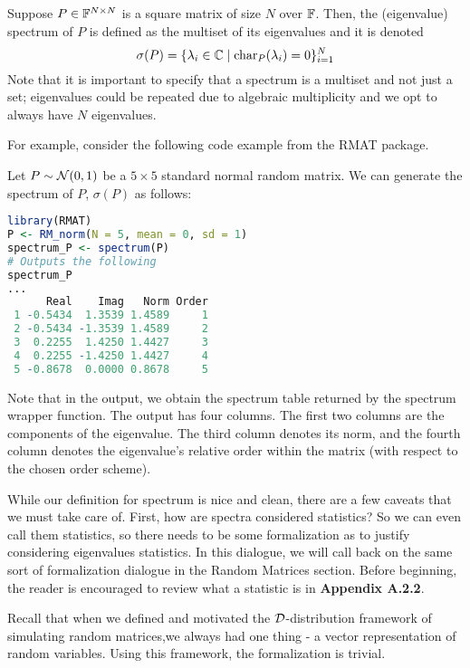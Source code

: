 
\begin{definition}[Spectrum]
Suppose $P \in \mathbb{F}^{N \times N}$ is a square matrix of size $N$ over $\mathbb{F}$. Then, the (eigenvalue) spectrum of $P$ is defined as the multiset of its eigenvalues and it is denoted
$$\sigma(P) = \{\lambda_i \in \mathbb{C} \mid \text{char}_P(\lambda_i) = 0 \}_{i=1}^N$$
Note that it is important to specify that a spectrum is a multiset and not just a set; eigenvalues could be repeated due to algebraic multiplicity and we opt to always have $N$ eigenvalues.
\end{definition}

\medskip
\noindent For example, consider the following code example from the RMAT package.
\begin{code}
Let $P \sim \mathcal{N}(0,1)$ be a $5 \times 5$ standard normal random matrix. We can generate the spectrum of $P$, $\sigma(P)$ as follows:
\end{code}

\begin{lstlisting}[language=R]
library(RMAT)
P <- RM_norm(N = 5, mean = 0, sd = 1)
spectrum_P <- spectrum(P)
# Outputs the following
spectrum_P
...
      Real    Imag   Norm Order
 1 -0.5434  1.3539 1.4589     1
 2 -0.5434 -1.3539 1.4589     2
 3  0.2255  1.4250 1.4427     3
 4  0.2255 -1.4250 1.4427     4
 5 -0.8678  0.0000 0.8678     5
\end{lstlisting}

Note that in the output, we obtain the spectrum table returned by the spectrum wrapper function. The output has four columns.
The first two columns are the components of the eigenvalue. The third column denotes its norm, and the fourth column denotes the eigenvalue's
relative order within the matrix (with respect to the chosen order scheme).

While our definition for spectrum is nice and clean, there are a few caveats that we must take care of.
First, how are spectra considered statistics? So we can even call them statistics, so there needs to be some formalization as to justify considering eigenvalues statistics.
In this dialogue, we will call back on the same sort of formalization dialogue in the Random Matrices section.
Before beginning, the reader is encouraged to review what a statistic is in \textbf{Appendix A.2.2}.

Recall that when we defined and motivated the $\mathcal{D}$-distribution framework of simulating random matrices,we always had one thing - a vector representation of random variables.
Using this framework, the formalization is trivial.

